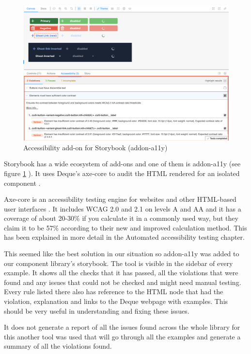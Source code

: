 \documentclass{master_thesis}
\begin{document}
\begin{figure}[H]
	\includegraphics[width=\textwidth]{img/addon-a11y.png}
	\caption{Accessibility add-on for Storybook (addon-a11y)}
	\label{fig:addon-a11y}
\end{figure}

Storybook has a wide ecosystem of add-ons and one of them is addon-a11y (see figure \ref{fig:addon-a11y} ). It uses Deque's axe-core to audit the HTML rendered for an isolated component \citep{addon-a11y}.

Axe-core is an accessibility testing engine for websites and other HTML-based user interfaces \citep{Deque2023}. It includes WCAG 2.0 and 2.1 on levels A and AA and it has a coverage of about 20-30\% if you calculate it in a commonly used way, but they claim it to be 57\% according to their new and improved calculation method. This has been explained in more detail in the Automated accessibility testing chapter.

This seemed like the best solution in our situation so addon-a11y was added to our component library’s storybook. The tool is visible in the sidebar of every example. It shows all the checks that it has passed, all the violations that were found and any issues that could not be checked and might need manual testing. Every rule listed there also has reference to the HTML node that had the violation, explanation and links to the Deque webpage with examples. This should be very useful in understanding and fixing these issues.

It does not generate a report of all the issues found across the whole library for this another tool was used that will go through all the examples and generate a summary of all the violations found.
\end{document}
